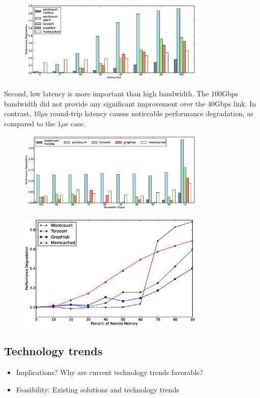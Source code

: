 %
\begin{figure}
  \centering
    \includegraphics[width = 3.5in]{img/fix_bw_vary_latency.eps} 
  \caption{\small{}}
  \label{fig:impl}
\end{figure}
%
Second, low latency is more important than high bandwidth. The $100$Gbps bandwidth did not provide any significant improvement over the $40$Gbps link. In contrast, $10\mu$s round-trip latency causes noticeable performance degradation, as compared to the $1\mu$s case.

%
\begin{figure}
  \centering
    \includegraphics[width = 3.5in]{img/fix_latency_vary_bw.eps} 
  \caption{\small{}}
  \label{fig:impb}
\end{figure}
%


%
\begin{figure}
  \centering
    \includegraphics[width = 3.5in]{img/vary_remote_mem.eps} 
  \caption{\small{}}
  \label{fig:impb}
\end{figure}
%


\subsection{Technology trends}
\label{ssec:rtt}

\begin{itemize}
	\item Implications? Why are current technology trends favorable?
	\item Feasibility: Existing solutions and technology trends
\end{itemize}